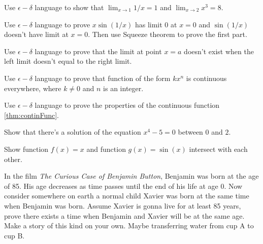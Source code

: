 \documentclass[Calculus 1 Recitation.tex]{subfiles}
\begin{document}
\begin{myleftlinebox}
	Use $\epsilon-\delta$ language to show that $\lim_{x\to 1} 1/x = 1$ and $\lim_{x\to 2} x^3 = 8$.
	\tcblower
	\vspace{2em}
\end{myleftlinebox}

\begin{myleftlinebox}
	Use $\epsilon-\delta$ language to prove $x\sin(1/x)$ has limit $0$ at $x=0$ and $\sin(1/x)$ doesn't have limit at $x=0$. Then use Squeeze theorem to prove the first part.
	\tcblower
	\vspace{2em}
\end{myleftlinebox}

\begin{myleftlinebox}
	Use $\epsilon-\delta$ language to prove that the limit at point $x=a$ doesn't exist when the left limit doesn't equal to the right limit.
	\tcblower
	\vspace{2em}
\end{myleftlinebox}

\begin{myleftlinebox}
	Use $\epsilon-\delta$ language to prove that function of the form $k x^n$ is continuous everywhere, where $k\neq 0$ and $n$ is an integer.
	\tcblower
	\vspace{2em}
\end{myleftlinebox}

\begin{myleftlinebox}
	Use $\epsilon-\delta$ language to prove the properties of the continuous function \autoref {thm:continFunc}.
	\tcblower
	\vspace{2em}
\end{myleftlinebox}

\begin{myleftlinebox}
	Show that there's a solution of the equation $x^4-5=0$ between $0$ and $2$.
	\tcblower
	\vspace{2em}
\end{myleftlinebox}

\begin{myleftlinebox}
	Show function $f(x)=x$ and function $g(x)=\sin(x)$ intersect with each other.
	\tcblower
	\vspace{2em}
\end{myleftlinebox}

\begin{myleftlinebox}
	In the film \emph{The Curious Case of Benjamin Button}, Benjamin was born at the age of 85. His age decreases as time passes until the end of his life at age 0. Now consider somewhere on earth a normal child Xavier was born at the same time when Benjamin was born. Assume Xavier is gonna live for at least 85 years, prove there exists a time when Benjamin and Xavier will be at the same age. Make a story of this kind on your own. Maybe transferring water from cup A to cup B.
	\tcblower
	\vspace{2em}
\end{myleftlinebox}
\end{document}
